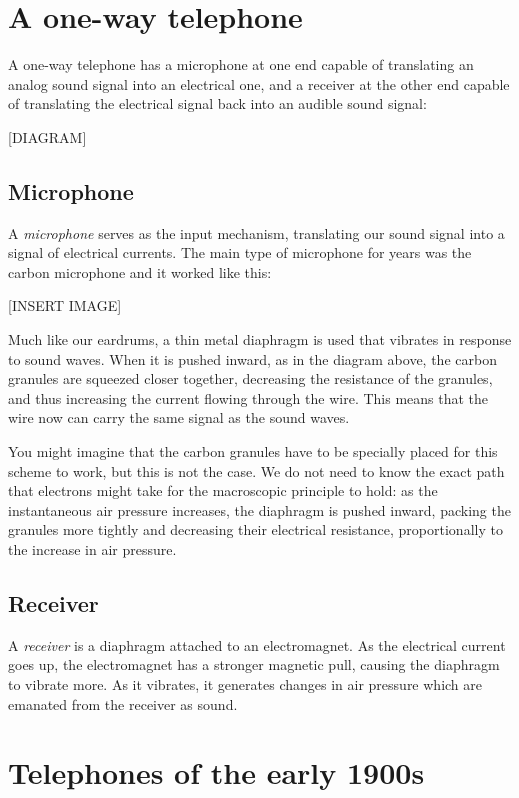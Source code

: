 \documentclass[UTF8]{book}
\begin{document}
\begin{CJK}{UTF8}{gbsn}
\section{A one-way telephone}

A one-way telephone has a microphone at one end capable of translating an analog sound signal into an electrical one, and a receiver at the other end capable of translating the electrical signal back into an audible sound signal:

[DIAGRAM]

\subsection{Microphone}

A \emph{microphone} serves as the input mechanism, translating our sound signal into a signal of electrical currents. The main type of microphone for years was the carbon microphone and it worked like this:

[INSERT IMAGE]

Much like our eardrums, a thin metal diaphragm is used that vibrates in response to sound waves. When it is pushed inward, as in the diagram above, the carbon granules are squeezed closer together, decreasing the resistance of the granules, and thus increasing the current flowing through the wire. This means that the wire now can carry the same signal as the sound waves.

You might imagine that the carbon granules have to be specially placed for this scheme to work, but this is not the case. We do not need to know the exact path that electrons might take for the macroscopic principle to hold: as the instantaneous air pressure increases, the diaphragm is pushed inward, packing the granules more tightly and decreasing their electrical resistance, proportionally to the increase in air pressure.

\subsection{Receiver}

A \emph{receiver} is a diaphragm attached to an electromagnet. As the electrical current goes up, the electromagnet has a stronger magnetic pull, causing the diaphragm to vibrate more. As it vibrates, it generates changes in air pressure which are emanated from the receiver as sound.

\section{Telephones of the early 1900s}


\end{CJK}
\end{document}
